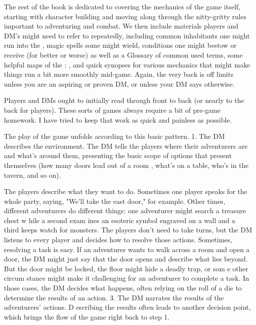 \documentclass[twoside, 12pt, letterpaper]{report}\usepackage[]{graphicx}\usepackage[]{color}
\begin{document}
\begin{multicols*}{2}
The rest of the book is dedicated to covering the mechanics of the game itself, starting with character building and moving along through the nitty-gritty rules important to adventuring and combat. We then include materials players and DM's might need to refer to repeatedly, including common inhabitants one might run into \ooi the \mw, magic spells some might wield, conditions one might bestow or receive (for better or worse) as well as a Glossary of common used terms, some helpful maps of the \mw: \ooi, and quick synopses for various mechanics that might make things run a bit more smoothly mid-game. Again, the very back is off limits unless you are an aspiring or proven DM, or unless your DM says otherwise.

Players and DMs ought to initially read through front to back (or nearly to the back for players). These sorts of games always require a bit of pre-game homework. I have tried to keep that work as quick and painless as possible. 

The play of the game unfolds according to this basic pattern. 1. The DM describes the environment. The DM tells the players where their adventurers are and what's around them, presenting the basic scope of options that present themselves (how many doors lead out of a room , what's on a table, who's in the tavern, and so on).

The players describe what they want to do. Sometimes one player speaks for the whole party, saying, "We'll take the east door," for example. Other times, different adventurers do different things: one adventurer might search a treasure chest w hile a second exam ines an esoteric symbol engraved on a wall and a third keeps watch for monsters. The players don't need to take turns, but the DM listens to every player and decides how to resolve those actions. Sometimes, resolving a task is easy. If an adventurer wants to walk across a room and open a door, the DM might just say that the door opens and describe what lies beyond. But the door might be locked, the floor might hide a deadly trap, or som e other circum stance might make it challenging for an adventurer to complete a task. In those cases, the DM decides what happens, often relying on the roll of a die to determine the results of an action. 3. The DM narrates the results of the adventurers' actions. D escribing the results often leads to another decision point, which brings the flow of the game right
 back to step 1.


\end{multicols*}
\end{document}
